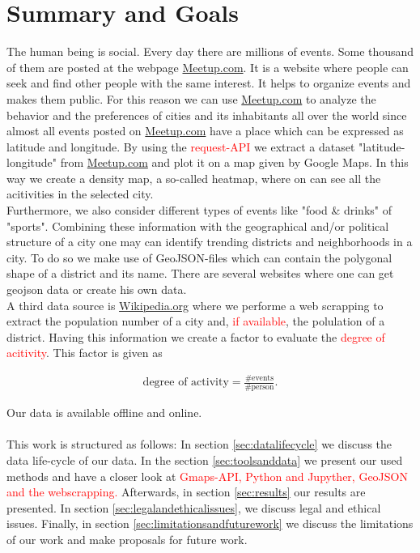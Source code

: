 \section{Summary and Goals}\label{sec:summaryandgoals}

The human being is social. Every day there are millions of events. Some thousand of them are posted at the webpage \url{Meetup.com}. It is a website where people can seek and find other people with the same interest. It helps to organize events and makes them public. For this reason we can use \url{Meetup.com} to analyze the behavior and the preferences of cities and its inhabitants all over the world since almost all events posted on \url{Meetup.com} have a place which can be expressed as latitude and longitude. By using the \textcolor{red}{request-API} we extract a dataset "latitude-longitude" from \url{Meetup.com} and plot it on a map given by Google Maps. In this way we create a density map, a so-called heatmap, where on can see all the acitivities in the selected city.\\Furthermore, we also consider different types of events like "food \& drinks" of "sports". Combining these information with the geographical and/or political structure of a city one may can identify trending districts and neighborhoods in a city. To do so we make use of GeoJSON-files which can contain the polygonal shape of a district and its name. There are several websites where one can get geojson data or create his own data.\\A third data source is \url{Wikipedia.org} where we performe a web scrapping to extract the population number of a city and, \textcolor{red}{if available}, the polulation of a district. Having this information we create a factor to evaluate the \textcolor{red}{degree of acitivity}. This factor is given as

\begin{align*}
	\text{degree of activity} = \frac{\text{\#events}}{\text{\#person}}.
\end{align*}

Our data is available offline and online.\\ \\This work is structured as follows: In section \ref{sec:datalifecycle} we discuss the data life-cycle of our data. In the section \ref{sec:toolsanddata} we present our used methods and have a closer look at \textcolor{red}{Gmaps-API, Python and Jupyther, GeoJSON and the webscrapping.} Afterwards, in section \ref{sec:results} our results are presented. In section \ref{sec:legalandethicalissues}, we discuss legal and ethical issues. Finally, in section \ref{sec:limitationsandfuturework} we discuss the limitations of our work and make proposals for future work.